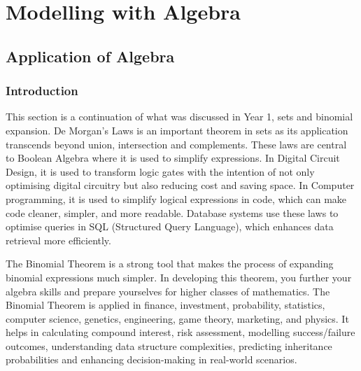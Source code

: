 \section*{Modelling with Algebra}
\subsection*{Application of Algebra}

\subsubsection*{Introduction}

This section is a continuation of what was discussed in Year 1, sets and binomial
expansion. De Morgan's Laws is an important theorem in sets as its application
transcends beyond union, intersection and complements. These laws are
central to Boolean Algebra where it is used to simplify expressions. In Digital
Circuit Design, it is used to transform logic gates with the intention of not only
optimising digital circuitry but also reducing cost and saving space. In Computer
programming, it is used to simplify logical expressions in code, which can make
code cleaner, simpler, and more readable. Database systems use these laws to
optimise queries in SQL (Structured Query Language), which enhances data
retrieval more efficiently.

The Binomial Theorem is a strong tool that makes the process of expanding
binomial expressions much simpler. In developing this theorem, you further
your algebra skills and prepare yourselves for higher classes of mathematics.
The Binomial Theorem is applied in finance, investment, probability, statistics,
computer science, genetics, engineering, game theory, marketing, and physics. It
helps in calculating compound interest, risk assessment, modelling success/failure
outcomes, understanding data structure complexities, predicting inheritance
probabilities and enhancing decision-making in real-world scenarios.

